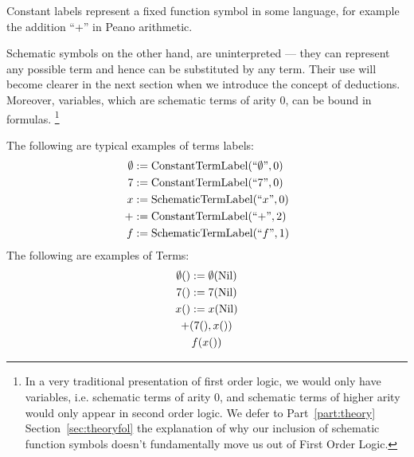 Constant labels represent a fixed function symbol in some language, for example the addition ``+'' in Peano arithmetic.

Schematic symbols on the other hand, are uninterpreted --- they can represent any possible term and hence can be substituted by any term. Their use will become clearer in the next section when we introduce the concept of deductions.  Moreover, variables, which are schematic terms of arity 0, can be bound in formulas. \footnote{In a very traditional presentation of first order logic, we would only have variables, i.e. schematic terms of arity 0, and schematic terms of higher arity would only appear in second order logic. We defer to Part~\ref{part:theory} Section~\ref{sec:theoryfol} the explanation of why our inclusion of schematic function symbols doesn't fundamentally move us out of First Order Logic.}

\begin{ex}[Terms]The following are typical examples of terms labels:
  \begin{align*}
    \emptyset & := \operatorname{ConstantTermLabel}(``\emptyset", 0) \\
    7         & := \operatorname{ConstantTermLabel}(``7", 0)         \\
    x         & := \operatorname{SchematicTermLabel}(``x", 0)        \\
    +         & := \operatorname{ConstantTermLabel}(``{+}", 2)       \\
    f         & := \operatorname{SchematicTermLabel}(``f", 1)        \\
  \end{align*}
  The following are examples of Terms:
  \begin{gather*}
    \emptyset() := \emptyset(\operatorname{Nil})\\
    7() := 7(\operatorname{Nil})\\
    x() := x(\operatorname{Nil})\\
    +(7(), x())\\
    f(x())
  \end{gather*}
  
\end{ex}


